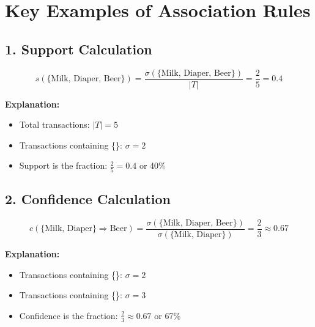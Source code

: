 \documentclass[a4paper,10pt]{article}
\begin{document}
\newpage %

\section*{\centering Key Examples of Association Rules}

\subsection*{1. Support Calculation}
\[
s(\{\text{Milk, Diaper, Beer}\}) = \frac{\sigma(\{\text{Milk, Diaper, Beer}\})}{|T|} = \frac{2}{5} = 0.4
\]

\textbf{Explanation:}
\begin{itemize}
    \item Total transactions: \(|T| = 5\)
    \item Transactions containing \{\}: \(\sigma = 2\)
    \item Support is the fraction: \(\frac{2}{5} = 0.4\) or 40\%
\end{itemize}

\vspace{1cm}

\subsection*{2. Confidence Calculation}
\[
c(\{\text{Milk, Diaper}\} \Rightarrow \text{Beer}) = \frac{\sigma(\{\text{Milk, Diaper, Beer}\})}{\sigma(\{\text{Milk, Diaper}\})} = \frac{2}{3} \approx 0.67
\]

\textbf{Explanation:}
\begin{itemize}
    \item Transactions containing \{\}: \(\sigma = 2\)
    \item Transactions containing \{\}: \(\sigma = 3\)
    \item Confidence is the fraction: \(\frac{2}{3} \approx 0.67\) or 67\%
\end{itemize}
\end{document}
